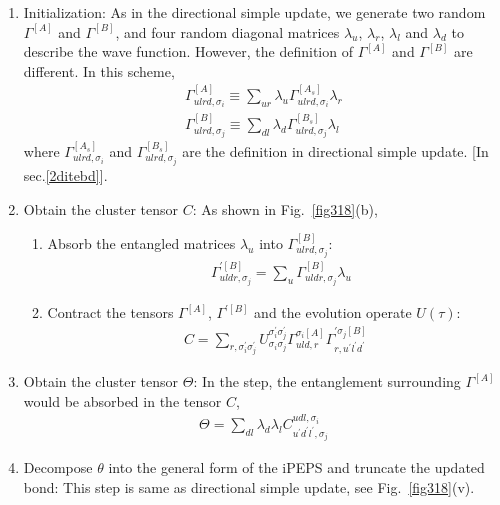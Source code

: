 \begin{enumerate}
	\item Initialization: As in the directional simple update, we generate two random $\Gamma^{[A]}$ and $\Gamma^{[B]}$, and four random diagonal matrices $\lambda_{u}$, $\lambda_{r}$, $\lambda_{l}$ and $\lambda_{d}$ to describe the wave function. However, the definition of $\Gamma^{[A]}$ and $\Gamma^{[B]}$ are different. In this scheme,
		\begin{align}
			\Gamma^{[A]}_{ulrd,\sigma_i} \equiv \sum_{ur}{\lambda_{u} \Gamma^{[A_s]}_{ulrd,\sigma_i} \lambda_{r}} \\
			\Gamma^{[B]}_{ulrd,\sigma_j} \equiv \sum_{dl}{\lambda_{d} \Gamma^{[B_s]}_{ulrd,\sigma_j} \lambda_{l}}
		\end{align}
		where $\Gamma^{[A_s]}_{ulrd,\sigma_i}$ and $\Gamma^{[B_s]}_{ulrd,\sigma_j}$ are the definition in directional simple update. [In sec.\ref{2ditebd}].
	\item Obtain the cluster tensor $C$: As shown in Fig.~\ref{fig318}(b),
			\begin{enumerate}
				\item Absorb the entangled matrices $\lambda_{u}$ into  $\Gamma^{[B]}_{ulrd,\sigma_j}$:
					\begin{align}
						&\Gamma^{\prime [B]}_{uldr, \sigma_j} = \sum_{u}{\Gamma^{[B]}_{uldr,\sigma_j} \lambda_{u}}
					\end{align}
				\item Contract the tensors $\Gamma^{[A]}$, $\Gamma^{\prime [B]}$ and the evolution operate $U(\tau)$: 
					\begin{align}
						C = \sum_{r,\sigma_i^{\prime}\sigma_j^{\prime}}{U^{\sigma_i^{\prime}\sigma_j^{\prime}}_{\sigma_i\sigma_j} \Gamma^{\sigma_i [A]}_{uld,r} \Gamma^{\prime \sigma_j[B]}_{r,u^{\prime} l^{\prime} d^{\prime}}}
					\end{align}
			\end{enumerate}
		\item Obtain the cluster tensor $\Theta$: In the step, the entanglement surrounding $\Gamma^{[A]}$ would be absorbed in the tensor $C$,
			\begin{align}
				\Theta = \sum_{dl}{\lambda_{d} \lambda_{l} C^{udl,\sigma_i}_{u^{\prime}d^{\prime}l^{\prime},\sigma_j}}
			\end{align}
		\item Decompose $\theta$ into the general form of the iPEPS and truncate the updated bond: This step is same as directional simple update, see Fig.~\ref{fig318}(v).

\end{enumerate}
